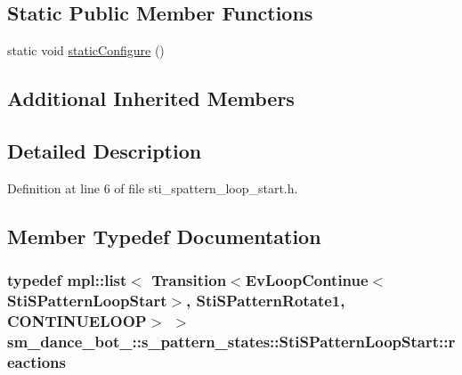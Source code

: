 \subsection*{Static Public Member Functions}
\begin{DoxyCompactItemize}
\item 
static void \hyperlink{structsm__dance__bot__3_1_1s__pattern__states_1_1StiSPatternLoopStart_a17ae91ce441fa4f610b76a223b961397}{static\+Configure} ()
\end{DoxyCompactItemize}
\subsection*{Additional Inherited Members}


\subsection{Detailed Description}


Definition at line 6 of file sti\+\_\+spattern\+\_\+loop\+\_\+start.\+h.



\subsection{Member Typedef Documentation}
\subsubsection[{\texorpdfstring{reactions}{reactions}}]{\setlength{\rightskip}{0pt plus 5cm}typedef mpl\+::list$<$ Transition$<$Ev\+Loop\+Continue$<${\bf Sti\+S\+Pattern\+Loop\+Start}$>$, {\bf Sti\+S\+Pattern\+Rotate1}, C\+O\+N\+T\+I\+N\+U\+E\+L\+O\+OP$>$ $>$ {\bf sm\+\_\+dance\+\_\+bot\+\_\+::s\+\_\+pattern\+\_\+states\+::\+Sti\+S\+Pattern\+Loop\+Start\+::reactions}}\hypertarget{structsm__dance__bot__3_1_1s__pattern__states_1_1StiSPatternLoopStart_a0ccc66b55fb73dc045bff761f63388fa}{}\label{structsm__dance__bot__3_1_1s__pattern__states_1_1StiSPatternLoopStart_a0ccc66b55fb73dc045bff761f63388fa}


